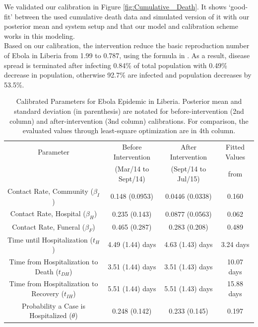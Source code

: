 We validated our calibration in Figure \ref{fig:Cumulative _Death}. It shows `good-fit' between the used cumulative death data and simulated version of it with our posterior mean and system setup and that our model and calibration scheme works in this modeling.\\


Based on our calibration, the intervention reduce the basic reproduction number of Ebola in Liberia from 1.99 to 0.787, using the formula in \cite{Legrand2007}. As a result, disease spread is terminated after infecting 0.84\% of total population with 0.49\% decrease in population, otherwise 92.7\% are infected and population decreases by 53.5\%.\\

\begin{table}[ht]
\caption{Calibrated Parameters for Ebola Epidemic in Liberia. Posterior mean and standard deviation (in parenthesis) are notated for before-intervention (2nd column) and after-intervention (3nd column) calibrations. For comparison, the evaluated values through least-square optimization \cite{Rivers2014} are in 4th column.} %
\centering %
\begin{tabular}{c c c c}
\hline\hline %
Parameter &  Before Intervention  & After Intervention & Fitted Values\\ [0.5ex]
 & (Mar/14 to Sept/14) &  (Sept/14 to Jul/15) & from \cite{Rivers2014}\\ [0.5ex] %
\hline %
{Contact Rate, Community  (${\beta_{I}}$) }& {0.148 (0.0953)} & {0.0446 (0.0338)} & 0.160 \\
Contact Rate, Hospital  ($\beta_{H}$) & 0.235 (0.143) & 0.0877 (0.0563) & 0.062\\
Contact Rate, Funeral  ($\beta_{F}$) & 0.465 (0.287)& 0.283 (0.208) & 0.489 \\
Time until Hospitalization (${t_{H}}$) & 4.49 (1.44) days & 4.63 (1.43) days & 3.24 days  \\
Time from Hospitalization to Death (${t_{DH}}$) & 3.51 (1.44) days & 3.51 (1.43) days  & 10.07 days\\
Time from Hospitalization to Recovery (${t_{IH}}$) & 5.51 (1.44) days & 5.51 (1.43) days  & 15.88 days\\
Probability a Case is Hospitalized ($\theta$) & 0.248 (0.142) & 0.233 (0.145) & 0.197\\
[1ex]
\hline
\end{tabular}
\label{tab:calibratedParameters}
\end{table}

